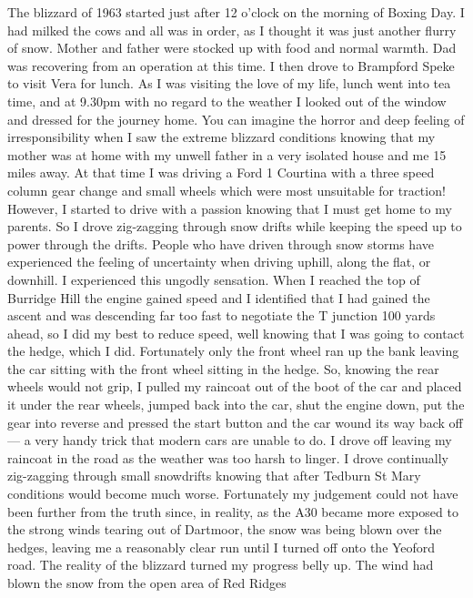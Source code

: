 
The blizzard of 1963 started just after 12 o'clock on the morning of Boxing Day.
I had milked the cows and all was in order, as I thought it was just another
flurry of snow. Mother and father were stocked up with food and normal warmth.
Dad was recovering from an operation at this time. I then drove to Brampford
Speke to visit Vera for lunch. As I was visiting the love of my life, lunch
went into tea time, and at 9.30pm with no regard to the weather I looked out of
the window and dressed for the journey home. You can imagine the horror and
deep feeling of irresponsibility when I saw the extreme blizzard conditions
knowing that my mother was at home with my unwell father in a very isolated
house and me 15 miles away. At that time I was driving a Ford 1 Courtina with a
three speed column gear change and small wheels which were most unsuitable for
traction! However, I started to drive with a passion knowing that I must get
home to my parents. So I drove zig-zagging through snow drifts while keeping
the speed up to power through the drifts. People who have driven through snow
storms have experienced the feeling of uncertainty when driving uphill, along
the flat, or downhill. I experienced this ungodly sensation. When I reached the
top of Burridge Hill the engine gained speed and I identified that I had gained
the ascent and was descending far too fast to negotiate the T junction 100
yards ahead, so I did my best to reduce speed, well knowing that I was going to
contact the hedge, which I did. Fortunately only the front wheel ran up the
bank leaving the car sitting with the front wheel sitting in the hedge. So,
knowing the rear wheels would not grip, I pulled my raincoat out of the boot of
the car and placed it under the rear wheels, jumped back into the car, shut the
engine down, put the gear into reverse and pressed the start button and the car
wound its way back off --- a very handy trick that modern cars are unable to
do. I drove off leaving my raincoat in the road as the weather was too harsh to
linger. I drove continually zig-zagging through small snowdrifts knowing that
after Tedburn St Mary conditions would become much worse. Fortunately my
judgement could not have been further from the truth since, in reality, as the
A30 became more exposed to the strong winds tearing out of Dartmoor, the snow
was being blown over the hedges, leaving me a reasonably clear run until I
turned off onto the Yeoford road. The reality of the blizzard turned my
progress belly up. The wind had blown the snow from the open area of Red Ridges
